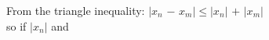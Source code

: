 \documentclass[preview]{standalone}
\begin{document}
\begin{center}
From the triangle inequality: $|$$x_n$ $-$ $x_m$$|$$\leq$$|$$x_n$$|$ $+$ $|$$x_m$$|$\\so if $|x_n|$ and
\end{center}
\end{document}
